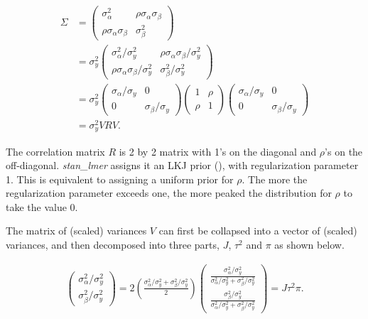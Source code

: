 \begin{align}
	\Sigma &=
	\left(\begin{matrix}
		\sigma_\alpha^2 & \rho\sigma_\alpha \sigma_\beta \\
		\rho\sigma_\alpha\sigma_\beta&\sigma_\beta^2
	\end{matrix} \right)\\ &=
	\sigma_y^2\left(\begin{matrix}
		\sigma_\alpha^2/\sigma_y^2 & \rho\sigma_\alpha \sigma_\beta/\sigma_y^2 \\
		\rho\sigma_\alpha\sigma_\beta/\sigma_y^2 & \sigma_\beta^2/\sigma_y^2
	\end{matrix} \right)\\ &=
	\sigma_y^2\left(\begin{matrix}
		\sigma_\alpha/\sigma_y & 0 \\
		0&\sigma_\beta/\sigma_y
	\end{matrix} \right)
	\left(\begin{matrix}
		1 & \rho\\
		\rho&1
	\end{matrix} \right)
	\left(\begin{matrix}
		\sigma_\alpha/\sigma_y & 0 \\
		0&\sigma_\beta/\sigma_y
	\end{matrix} \right)\\
	&= \sigma_y^2VRV.
\end{align}


The correlation matrix $R$ is 2 by 2 matrix with 1's on the diagonal and $\rho$'s on the off-diagonal. \textit{stan\_lmer} assigns it an LKJ prior (\cite{lewandowski2009generating}), with regularization parameter 1.  This is equivalent to assigning a uniform prior for $\rho$.  The more the regularization parameter exceeds one, the more peaked the distribution for $\rho$ to take the value 0.

The matrix of (scaled) variances $V$ can first be collapsed into a vector of (scaled) variances, and then decomposed into three parts, $J$, $\tau^2$ and $\pi$ as shown below.

\begin{align}
	\left(\begin{matrix}
		\sigma_\alpha^2/\sigma_y^2 \\
		\sigma_\beta^2/\sigma_y^2
	\end{matrix} \right) =
	2\left(\frac{\sigma_\alpha^2/\sigma_y^2 + \sigma_\beta^2/\sigma_y^2}{2}\right)\left(\begin{matrix}
		\frac{\sigma_\alpha^2/\sigma_y^2}{\sigma_\alpha^2/\sigma_y^2 + \sigma_\beta^2/\sigma_y^2} \\
		\frac{\sigma_\beta^2/\sigma_y^2}{\sigma_\alpha^2/\sigma_y^2 + \sigma_\beta^2/\sigma_y^2}
	\end{matrix} \right)=
	J\tau^2 \pi.
\end{align}



